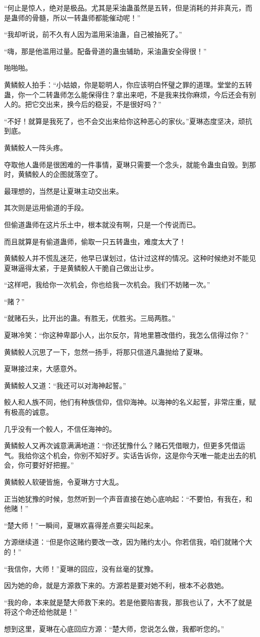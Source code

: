 \begin{this_body}
“何止是惊人，绝对是极品。尤其是采油蛊虽然是五转，但是消耗的并非真元，而是蛊师的骨髓，所以一转蛊师都能催动呢！”

“我却听说，前不久有人因为滥用采油蛊，自己被抽死了。”

“嗨，那是他滥用过量。配备骨道的蛊虫辅助，采油蛊安全得很！”

啪啪啪。

黄鳞鲛人拍手：“小姑娘，你是聪明人，你应该明白怀璧之罪的道理。堂堂的五转蛊，你一个二转蛊师怎么能保得住？拿出来吧，不是我来找你麻烦，今后还会有别人的。把它交出来，换今后的稳妥，不是很好吗？”

“不好！就算是我死了，也不会交出来给你这种恶心的家伙。”夏琳态度坚决，顽抗到底。

黄鳞鲛人一阵头疼。

夺取他人蛊师是很困难的一件事情，夏琳只需要一个念头，就能令蛊虫自毁。到那时，黄鳞鲛人的企图就落空了。

最理想的，当然是让夏琳主动交出来。

其次则是运用偷道的手段。

但偷道蛊师在这片乐土中，根本就没有啊，只是一个传说而已。

而且就算是有偷道蛊师，偷取一只五转蛊虫，难度太大了！

黄鳞鲛人并不慌乱迷茫，他早已谋划过，估计过这样的情况。这种时候绝对不能见夏琳逼得太紧，于是黄鳞鲛人干脆自己做出让步。

“这样吧，我给你一次机会，你也给我一次机会。我们不妨赌一次。”

“赌？”

“就赌石头，比开出的蛊。有胜无，优胜劣。三局两胜。”

夏琳冷笑：“你这种卑鄙小人，出尔反尔，背地里篡改借约，我怎么信得过你？”

黄鳞鲛人沉思了一下，忽然一扬手，将那只信道凡蛊抛给了夏琳。

夏琳接过来，大感意外。

黄鳞鲛人又道：“我还可以对海神起誓。”

鲛人和人族不同，他们有种族信仰，信仰海神。以海神的名义起誓，非常庄重，赋有极高的诚意。

几乎没有一个鲛人，不信任海神的。

黄鳞鲛人又再次诚意满满地道：“你还犹豫什么？赌石凭借眼力，但更多凭借运气。我给你这个机会，你别不知好歹。实话告诉你，这是你今天唯一能走出去的机会，你可要好好把握。”

黄鳞鲛人软硬皆施，令夏琳方寸大乱。

正当她犹豫的时候，忽然听到一个声音直接在她心底响起：“不要怕，有我在，和他赌！”

“楚大师！”一瞬间，夏琳欢喜得差点要尖叫起来。

方源继续道：“但是你这赌约要改一改，因为赌约太小。你若信我，咱们就赌个大的！”

“我信你，大师！”夏琳的回应，没有丝毫的犹豫。

因为她的命，就是方源救下来的。方源若是要对她不利，根本不必救她。

“我的命，本来就是楚大师救下来的。若是他要陷害我，那我也认了，大不了就是将这个命还给他就是！”

想到这里，夏琳在心底回应方源：“楚大师，您说怎么做，我都听您的。”

\end{this_body}

